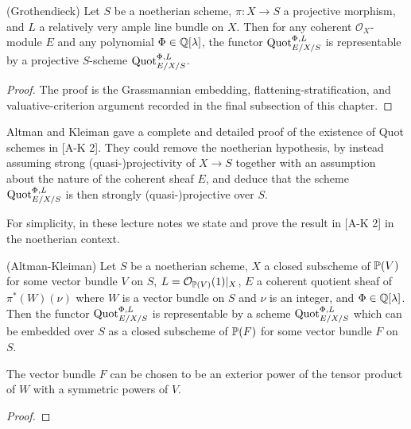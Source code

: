 \begin{theorem}\label{nhq-grothendieck-quot} {\rm (Grothendieck)}
Let $S$ be a noetherian scheme, $\pi: X\to S$ a projective morphism,
and $L$ a relatively very ample line bundle on $X$. Then for any
coherent ${\mathcal O}_X$-module $E$ and any polynomial $\Phi \in \mathbb{Q}[\lambda]$,
the functor $\operatorname{Quot}_{E/X/S}^{\Phi,L}$ is representable
by a projective $S$-scheme $\operatorname{Quot}_{E/X/S}^{\Phi,L}$.
\end{theorem}

\begin{proof}
The proof is the Grassmannian embedding, flattening-stratification,
and valuative-criterion argument recorded in the final subsection of this chapter.
\end{proof}


Altman and Kleiman gave a complete and detailed proof of the existence of
Quot schemes in [A-K 2]. They could remove the noetherian hypothesis,
by instead assuming strong (quasi-)projectivity of $X\to S$
together with an assumption about the nature of the coherent
sheaf $E$, and deduce that the scheme $\operatorname{Quot}_{E/X/S}^{\Phi,L}$ is then
strongly (quasi-)projective over $S$.

For simplicity, in these lecture notes we state and prove the result in [A-K 2]
in the noetherian context.

\begin{theorem}\label{nhq-altman-kleiman-quot} {\rm (Altman-Kleiman)}
Let $S$ be a noetherian scheme, $X$ a closed subscheme of
$\mathbb{P}(V)$ for some vector bundle $V$ on $S$, $L = {\mathcal O}_{\mathbb{P}(V)}(1)|_X$,
$E$ a coherent quotient sheaf of $\pi^*(W)(\nu)$ where
$W$ is a vector bundle on $S$ and $\nu$ is an integer, and
$\Phi \in \mathbb{Q}[\lambda]$.
Then the functor $\operatorname{Quot}_{E/X/S}^{\Phi,L}$ is representable
by a scheme $\operatorname{Quot}_{E/X/S}^{\Phi,L}$ which can be embedded over $S$ as a
closed subscheme of $\mathbb{P}(F)$ for some vector bundle $F$ on $S$.

The vector bundle $F$ can be chosen to be an exterior power of
the tensor product of $W$ with a symmetric powers of $V$.
\end{theorem}

\begin{proof}
\notready
\end{proof}

